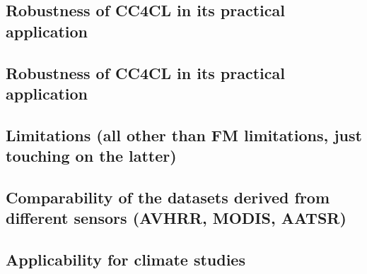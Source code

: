 \label{conclusions}
\subsection{Robustness of CC4CL in its practical application}
\subsection{Robustness of CC4CL in its practical application}
\subsection{Limitations (all other than FM limitations, just touching on the latter)}
\subsection{Comparability of the datasets derived from different sensors (AVHRR, MODIS, AATSR)}
\subsection{Applicability for climate studies}
